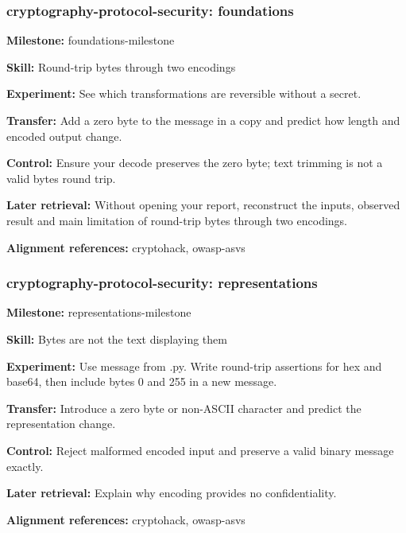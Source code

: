\subsubsection{cryptography-protocol-security: foundations}
\noindent\textbf{Milestone:} foundations-milestone\par
\noindent\textbf{Skill:} Round-trip bytes through two encodings\par
\noindent\textbf{Experiment:} See which transformations are reversible without a secret.\par
\noindent\textbf{Transfer:} Add a zero byte to the message in a copy and predict how length and encoded output change.\par
\noindent\textbf{Control:} Ensure your decode preserves the zero byte; text trimming is not a valid bytes round trip.\par
\noindent\textbf{Later retrieval:} Without opening your report, reconstruct the inputs, observed result and main limitation of round-trip bytes through two encodings.\par
\noindent\textbf{Alignment references:} cryptohack, owasp-asvs\par
\subsubsection{cryptography-protocol-security: representations}
\noindent\textbf{Milestone:} representations-milestone\par
\noindent\textbf{Skill:} Bytes are not the text displaying them\par
\noindent\textbf{Experiment:} Use message from .py. Write round-trip assertions for hex and base64, then include bytes 0 and 255 in a new message.\par
\noindent\textbf{Transfer:} Introduce a zero byte or non-ASCII character and predict the representation change.\par
\noindent\textbf{Control:} Reject malformed encoded input and preserve a valid binary message exactly.\par
\noindent\textbf{Later retrieval:} Explain why encoding provides no confidentiality.\par
\noindent\textbf{Alignment references:} cryptohack, owasp-asvs\par
